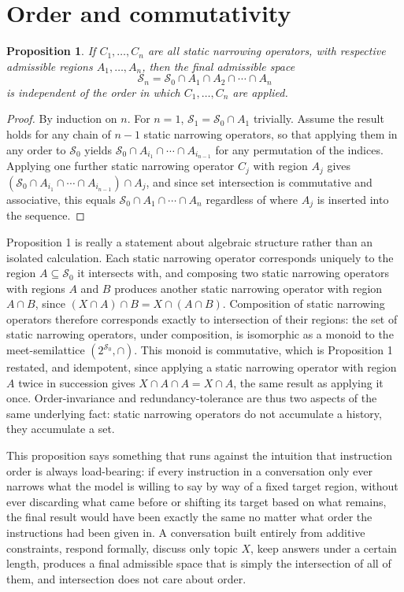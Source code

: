 \documentclass[11pt]{article}
\newtheorem{proposition}{Proposition}
\begin{document}
\section{Order and commutativity}

\begin{proposition}
If $C_1, \ldots, C_n$ are all static narrowing operators, with respective admissible regions $A_1, \ldots, A_n$, then the final admissible space
\[
\mathcal{S}_n = \mathcal{S}_0 \cap A_1 \cap A_2 \cap \cdots \cap A_n
\]
is independent of the order in which $C_1, \ldots, C_n$ are applied.
\end{proposition}

\begin{proof}
By induction on $n$. For $n = 1$, $\mathcal{S}_1 = \mathcal{S}_0 \cap A_1$ trivially. Assume the result holds for any chain of $n - 1$ static narrowing operators, so that applying them in any order to $\mathcal{S}_0$ yields $\mathcal{S}_0 \cap A_{i_1} \cap \cdots \cap A_{i_{n-1}}$ for any permutation of the indices. Applying one further static narrowing operator $C_j$ with region $A_j$ gives $(\mathcal{S}_0 \cap A_{i_1} \cap \cdots \cap A_{i_{n-1}}) \cap A_j$, and since set intersection is commutative and associative, this equals $\mathcal{S}_0 \cap A_1 \cap \cdots \cap A_n$ regardless of where $A_j$ is inserted into the sequence.
\end{proof}

Proposition 1 is really a statement about algebraic structure rather than an isolated calculation. Each static narrowing operator corresponds uniquely to the region $A \subseteq \mathcal{S}_0$ it intersects with, and composing two static narrowing operators with regions $A$ and $B$ produces another static narrowing operator with region $A \cap B$, since $(X \cap A) \cap B = X \cap (A \cap B)$. Composition of static narrowing operators therefore corresponds exactly to intersection of their regions: the set of static narrowing operators, under composition, is isomorphic as a monoid to the meet-semilattice $(2^{\mathcal{S}_0}, \cap)$. This monoid is commutative, which is Proposition 1 restated, and idempotent, since applying a static narrowing operator with region $A$ twice in succession gives $X \cap A \cap A = X \cap A$, the same result as applying it once. Order-invariance and redundancy-tolerance are thus two aspects of the same underlying fact: static narrowing operators do not accumulate a history, they accumulate a set.

This proposition says something that runs against the intuition that instruction order is always load-bearing: if every instruction in a conversation only ever narrows what the model is willing to say by way of a fixed target region, without ever discarding what came before or shifting its target based on what remains, the final result would have been exactly the same no matter what order the instructions had been given in. A conversation built entirely from additive constraints, respond formally, discuss only topic $X$, keep answers under a certain length, produces a final admissible space that is simply the intersection of all of them, and intersection does not care about order.
\end{document}
